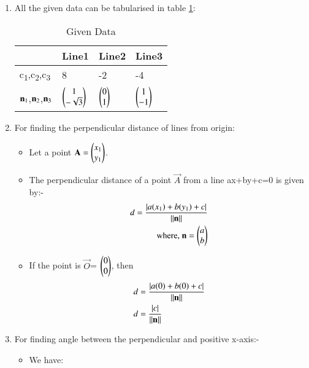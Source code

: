 \documentclass[journal,12pt,twocolumn]{IEEEtran}
\begin{document}
\begin{enumerate}
\item  All the given data can be tabularised in table \ref{tab:table1}:
\begin{table}[!ht]
\begin{center}
\begin{tabular}{ | m{2cm} | m{1.2cm}| m{1.2cm} | m{1.2cm} |} 
\hline
 & Line1 & Line2 & Line3 \\
\hline
c\textsubscript{1},c\textsubscript{2},c\textsubscript{3} & 8 & -2 & -4 \\ 
\hline
$\vec{n\textsubscript{1}}$,$\vec{n\textsubscript{2}}$,$\vec{n\textsubscript{3}}$ & $\myvec{1\\-\sqrt{3}}$ & $\myvec{0\\1}$ &$\myvec{1\\-1}$ \\ 
\hline
\end{tabular}
\end{center}
\caption{Given Data}
\label{tab:table1}
\end{table}
\item For finding the perpendicular distance of lines from origin:
\begin{itemize}
\item Let a point $\vec{A}=\myvec{x\textsubscript{1}\\y\textsubscript{1}}$.
\item The perpendicular distance of a point $\vec{A}$ from a line ax+by+c=0 is given by:-
\begin{align}
d=\frac { \left| a(x\textsubscript{1})+b(y\textsubscript{1})+c \right| }{ \norm{\vec{n}} }
\\
\text{where, } \vec{n}=\myvec{a\\b}
\end{align}
\item If the point is $\vec{O}$= $\myvec{0\\0}$, then
\begin{align}
d &=\frac { \left| a(0)+b(0)+c \right| }{ \norm{\vec{n}}}
\\
d&=\frac { \left| c \right| }{\norm{\vec{n}}}\label{eqA}
\end{align}
\end{itemize}
\item For finding angle between the perpendicular and positive x-axis:-
\begin{itemize}
    \item We have: 
    \begin{align}

\end{align}
\end{itemize}
\end{enumerate}
\end{document}
